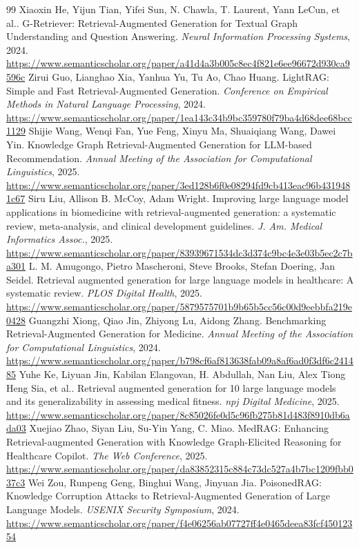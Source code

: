 \documentclass[11pt]{article}
\begin{document}
\begin{thebibliography}{99}
 Xiaoxin He, Yijun Tian, Yifei Sun, N. Chawla, T. Laurent, Yann LeCun, et al.. G-Retriever: Retrieval-Augmented Generation for Textual Graph Understanding and Question Answering. \emph{Neural Information Processing Systems}, 2024. \url{https://www.semanticscholar.org/paper/a41d4a3b005c8ec4f821e6ee96672d930ca9596c}
 Zirui Guo, Lianghao Xia, Yanhua Yu, Tu Ao, Chao Huang. LightRAG: Simple and Fast Retrieval-Augmented Generation. \emph{Conference on Empirical Methods in Natural Language Processing}, 2024. \url{https://www.semanticscholar.org/paper/1ea143c34b9bc359780f79ba4d68dee68bcc1129}
 Shijie Wang, Wenqi Fan, Yue Feng, Xinyu Ma, Shuaiqiang Wang, Dawei Yin. Knowledge Graph Retrieval-Augmented Generation for LLM-based Recommendation. \emph{Annual Meeting of the Association for Computational Linguistics}, 2025. \url{https://www.semanticscholar.org/paper/3ed128b6f0e08294fd9cb413eac96b4319481c67}
 Siru Liu, Allison B. McCoy, Adam Wright. Improving large language model applications in biomedicine with retrieval-augmented generation: a systematic review, meta-analysis, and clinical development guidelines. \emph{J. Am. Medical Informatics Assoc.}, 2025. \url{https://www.semanticscholar.org/paper/83939671534dc3d374c9bc4e3e03b5ec2c7ba301}
 L. M. Amugongo, Pietro Mascheroni, Steve Brooks, Stefan Doering, Jan Seidel. Retrieval augmented generation for large language models in healthcare: A systematic review. \emph{PLOS Digital Health}, 2025. \url{https://www.semanticscholar.org/paper/5879575701b9b65b5cc56c00d9eebbfa219e0428}
 Guangzhi Xiong, Qiao Jin, Zhiyong Lu, Aidong Zhang. Benchmarking Retrieval-Augmented Generation for Medicine. \emph{Annual Meeting of the Association for Computational Linguistics}, 2024. \url{https://www.semanticscholar.org/paper/b798cf6af813638fab09a8af6ad0f3df6c241485}
 Yuhe Ke, Liyuan Jin, Kabilan Elangovan, H. Abdullah, Nan Liu, Alex Tiong Heng Sia, et al.. Retrieval augmented generation for 10 large language models and its generalizability in assessing medical fitness. \emph{npj Digital Medicine}, 2025. \url{https://www.semanticscholar.org/paper/8c85026fe0d5c96fb275b81d483f8910db6ada03}
 Xuejiao Zhao, Siyan Liu, Su-Yin Yang, C. Miao. MedRAG: Enhancing Retrieval-augmented Generation with Knowledge Graph-Elicited Reasoning for Healthcare Copilot. \emph{The Web Conference}, 2025. \url{https://www.semanticscholar.org/paper/da83852315c884c73dc527a4b7bc1209fbb037c3}
 Wei Zou, Runpeng Geng, Binghui Wang, Jinyuan Jia. PoisonedRAG: Knowledge Corruption Attacks to Retrieval-Augmented Generation of Large Language Models. \emph{USENIX Security Symposium}, 2024. \url{https://www.semanticscholar.org/paper/f4e06256ab07727ff4e0465deea83fcf45012354}

\end{thebibliography}
\end{document}
